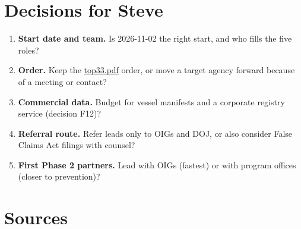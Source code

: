 \documentclass[letterpaper,11pt]{article}
\providecommand{\tightlist}{\setlength{\itemsep}{0pt}\setlength{\parskip}{0pt}}
\begin{document}
\hypertarget{decisions-for-steve}{%
\section{Decisions for Steve}\label{decisions-for-steve}}

\begin{enumerate}
\def\labelenumi{\arabic{enumi}.}
\tightlist
\item
  \textbf{Start date and team.} Is 2026-11-02 the right start, and who
  fills the five roles?
\item
  \textbf{Order.} Keep the \href{agencies/top33.pdf}{top33.pdf} order,
  or move a target agency forward because of a meeting or contact?
\item
  \textbf{Commercial data.} Budget for vessel manifests and a corporate
  registry service (decision F12)?
\item
  \textbf{Referral route.} Refer leads only to OIGs and DOJ, or also
  consider False Claims Act filings with counsel?
\item
  \textbf{First Phase 2 partners.} Lead with OIGs (fastest) or with
  program offices (closer to prevention)?
\end{enumerate}

\hypertarget{sources}{%
\section{Sources}\label{sources}}
\end{document}
